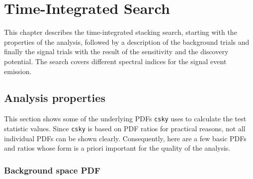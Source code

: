\chapter{Time-Integrated Search} \label{sec:csky_time_int}

This chapter describes the time-integrated stacking search, starting with the properties of the analysis, followed by a description of the background trials and finally the signal trials with the result of the sensitivity and the discovery potential.
The search covers different spectral indices for the signal event emission.

\section{Analysis properties}

This section shows some of the underlying PDFs \texttt{csky} uses to calculate the test statistic values.
Since \texttt{csky} is based on PDF ratios for practical reasons, not all individual PDFs can be shown clearly.
Consequently, here are a few basic PDFs and ratios whose form is a priori important for the quality of the analysis.

\subsection{Background space PDF}

